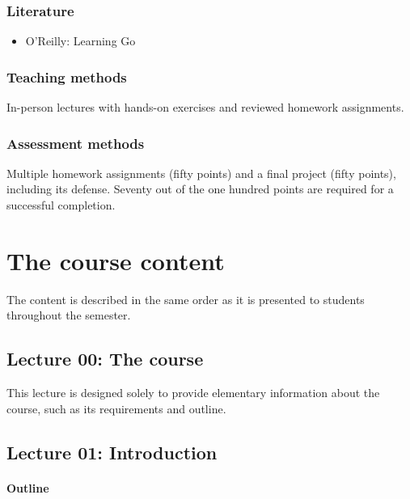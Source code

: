 \documentclass[
  digital,
  color,
  oneside,
  nosansbold,
  nocolorbold,
  lof,
  lot,
]{fithesis4}
\begin{document}
\subsection{Literature}

\begin{itemize}
    \item O'Reilly: Learning Go \cite{oreilly-learning-go}
\end{itemize}

\subsection{Teaching methods}

In-person lectures with hands-on exercises and reviewed homework assignments.

\subsection{Assessment methods}

Multiple homework assignments (fifty points) and a final project (fifty points), including its defense. Seventy out of the one hundred points are required for a successful completion.

\chapter{The course content}

The content is described in the same order as it is presented to students throughout the semester.

\section{Lecture 00: The course}

This lecture is designed solely to provide elementary information about the course, such as its requirements and outline.

\section{Lecture 01: Introduction}

\subsubsection{Outline}
\end{document}
